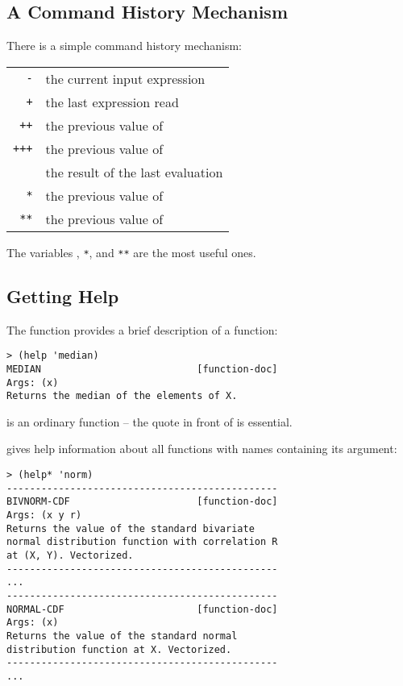 \begin{slide}{}
\subsection{A Command History Mechanism}
There is a simple command history mechanism:
\begin{center}
\begin{tabular}{rl}
{\tt -}   & the current input expression\\
{\tt +}   & the last expression read\\
{\tt ++}  & the previous value of \dcode{+}\\
{\tt +++} & the previous value of \dcode{++}\\
{\tt *}   & the result of the last evaluation\\
{\tt **}  & the previous value of \dcode{*}\\
{\tt ***} & the previous value of \dcode{**}
\end{tabular}
\end{center}
The variables {\tt *}, {\tt **}, and {\tt ***} are the most
useful ones.
\end{slide}

\begin{slide}{}
\subsection{Getting Help}
The  function provides a brief description of
a function:
{\Large
\begin{verbatim}
> (help 'median)
MEDIAN                           [function-doc]
Args: (x)
Returns the median of the elements of X.
\end{verbatim}}
 is an ordinary function -- the quote in front of
 is essential.
\end{slide}

\begin{slide}{}
 gives help information about all functions with names
containing its argument:
{\Large
\begin{verbatim}
> (help* 'norm)
-----------------------------------------------
BIVNORM-CDF                      [function-doc]
Args: (x y r)
Returns the value of the standard bivariate
normal distribution function with correlation R
at (X, Y). Vectorized.
-----------------------------------------------
...
-----------------------------------------------
NORMAL-CDF                       [function-doc]
Args: (x)
Returns the value of the standard normal
distribution function at X. Vectorized.
-----------------------------------------------
...
\end{verbatim}}
\end{slide}


